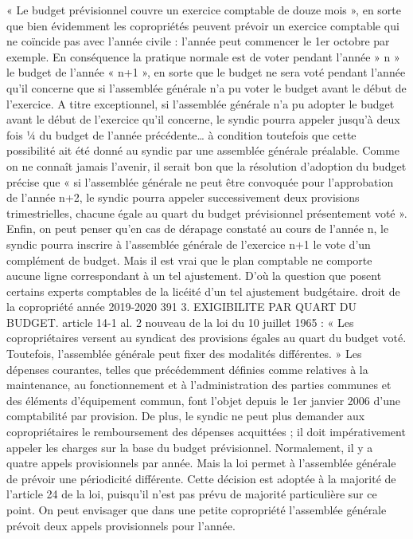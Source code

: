 « Le budget prévisionnel couvre un exercice comptable de douze mois », en sorte que bien évidemment les copropriétés peuvent prévoir un exercice comptable qui ne coïncide pas avec l’année civile : l’année peut commencer le 1er octobre par exemple.
En conséquence la pratique normale est de voter pendant l’année » n » le budget de l’année « n+1 », en sorte que le budget ne sera voté pendant l’année qu’il concerne que si l'assemblée générale n’a pu voter le budget avant le début de l’exercice.
A titre exceptionnel, si l'assemblée générale n’a pu adopter le budget avant le début de l’exercice qu’il concerne, le syndic pourra appeler jusqu’à deux fois ¼ du budget de l’année précédente… à condition toutefois que cette possibilité ait été donné au syndic par une assemblée générale préalable.
Comme on ne connaît jamais l’avenir, il serait bon que la résolution d’adoption du budget précise que « si l’assemblée générale ne peut être convoquée pour l’approbation de l’année n+2, le syndic pourra appeler successivement deux provisions trimestrielles, chacune égale au quart du budget prévisionnel présentement voté ».
Enfin, on peut penser qu’en cas de dérapage constaté au cours de l’année n, le syndic pourra inscrire à l’assemblée générale de l’exercice n+1 le vote d’un complément de budget. Mais il est vrai que le plan comptable ne comporte aucune ligne correspondant à un tel ajustement. D’où la question que posent certains experts comptables de la licéité d’un tel ajustement budgétaire.
droit de la copropriété année 2019-2020
391
3. EXIGIBILITE PAR QUART DU BUDGET.
article 14-1 al. 2 nouveau de la loi du 10 juillet 1965 :
« Les copropriétaires versent au syndicat des provisions égales au quart du budget voté. Toutefois, l'assemblée générale peut fixer des modalités différentes. »
Les dépenses courantes, telles que précédemment définies comme relatives à la maintenance, au fonctionnement et à l'administration des parties communes et des éléments d'équipement commun, font l'objet depuis le 1er janvier 2006 d'une comptabilité par provision.
De plus, le syndic ne peut plus demander aux copropriétaires le remboursement des dépenses acquittées ; il doit impérativement appeler les charges sur la base du budget prévisionnel.
Normalement, il y a quatre appels provisionnels par année. Mais la loi permet à l'assemblée générale de prévoir une périodicité différente. Cette décision est adoptée à la majorité de l'article 24 de la loi, puisqu’il n'est pas prévu de majorité particulière sur ce point.
On peut envisager que dans une petite copropriété l'assemblée générale prévoit deux appels provisionnels pour l'année.
